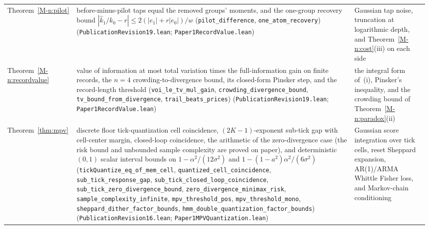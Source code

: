 \documentclass[12pt]{article}
\theoremstyle{definition}
\theoremstyle{remark}
\begin{document}
{\begin{longtable}{>{\raggedright\arraybackslash}p{}>{\raggedright\arraybackslash}p{}>{\raggedright\arraybackslash}p{}}
Theorem~\ref{M-n:pilot} & before-minus-pilot taps equal the removed groups' moments, and the one-group recovery bound $|\hat k_1/\hat k_0 - r| \le 2(|e_1| + r|e_0|)/w$ (\texttt{pilot\_difference}, \texttt{one\_atom\_recovery}) (\nolinkurl{PublicationRevision19.lean}; \nolinkurl{Paper1RecordValue.lean}) & Gaussian tap noise, truncation at logarithmic depth, and Theorem~\ref{M-n:cost}(iii) on each side\\
Theorem~\ref{M-n:recordvalue} & value of information at most total variation times the full-information gain on finite records, the $n=4$ crowding-to-divergence bound, its closed-form Pinsker step, and the record-length threshold (\texttt{voi\_le\_tv\_mul\_gain}, \texttt{crowding\_divergence\_bound}, \texttt{tv\_bound\_from\_divergence}, \texttt{trail\_beats\_prices}) (\nolinkurl{PublicationRevision19.lean}; \nolinkurl{Paper1RecordValue.lean}) & the integral form of~(i), Pinsker's inequality, and the crowding bound of Theorem~\ref{M-n:paradox}(ii)\\
Theorem~\ref{thm:mpv} & discrete floor tick-quantization cell coincidence, $(2K-1)$-exponent sub-tick gap with cell-center margin, closed-loop coincidence, the arithmetic of the zero-divergence case (the risk bound and unbounded sample complexity are proved on paper), and deterministic $(0,1)$ scalar interval bounds on $1 - \alpha^2/(12\sigma^2)$ and $1 - (1-a^2)\alpha^2/(6\sigma^2)$ (\texttt{tickQuantize\_eq\_of\_mem\_cell}, \texttt{quantized\_cell\_coincidence}, \texttt{sub\_tick\_response\_gap}, \texttt{sub\_tick\_closed\_loop\_coincidence}, \texttt{sub\_tick\_zero\_divergence\_bound}, \texttt{zero\_divergence\_minimax\_risk}, \texttt{sample\_complexity\_infinite}, \texttt{mpv\_threshold\_pos}, \texttt{mpv\_threshold\_mono}, \texttt{sheppard\_dither\_factor\_bounds}, \texttt{hmm\_double\_quantization\_factor\_bounds}) (\nolinkurl{PublicationRevision16.lean}; \nolinkurl{Paper1MPVQuantization.lean}) & Gaussian score integration over tick cells, reset Sheppard expansion, AR(1)/ARMA Whittle Fisher loss, and Markov-chain conditioning\\

\end{longtable}}
\end{document}
